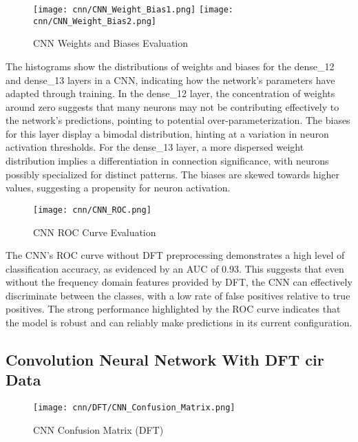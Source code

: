 \begin{figure}[H] 
  \centering
  \texttt{[image: cnn/CNN\_Weight\_Bias1.png]}
  \texttt{[image: cnn/CNN\_Weight\_Bias2.png]}
  \caption{CNN Weights and Biases Evaluation}\label{fig:cnn_weight_bias}
\end{figure}

The histograms show the distributions of weights and biases for the dense\_12 and dense\_13 layers in a CNN, indicating how the network's parameters have adapted through training. In the dense\_12 layer, the concentration of weights around zero suggests that many neurons may not be contributing effectively to the network's predictions, pointing to potential over-parameterization. The biases for this layer display a bimodal distribution, hinting at a variation in neuron activation thresholds. 
For the dense\_13 layer, a more dispersed weight distribution implies a differentiation in connection significance, with neurons possibly specialized for distinct patterns. The biases are skewed towards higher values, suggesting a propensity for neuron activation. 


\begin{figure}[H] 
  \centering
  \texttt{[image: cnn/CNN\_ROC.png]}
  \caption{CNN ROC Curve Evaluation}\label{fig:cnn_roc_curve}
\end{figure}

The CNN's ROC curve without DFT preprocessing demonstrates a high level of classification accuracy, as evidenced by an AUC of 0.93. This suggests that even without the frequency domain features provided by DFT, the CNN can effectively discriminate between the classes, with a low rate of false positives relative to true positives. The strong performance highlighted by the ROC curve indicates that the model is robust and can reliably make predictions in its current configuration.

\subsection{Convolution Neural Network With DFT \acrshort{cir} Data}\label{cnn_visual_dft}

\begin{figure}[H] 
  \centering
  \texttt{[image: cnn/DFT/CNN\_Confusion\_Matrix.png]}
  \caption{CNN Confusion Matrix (DFT)}\label{fig:cnn_confusion_matrix_dft}
\end{figure}

